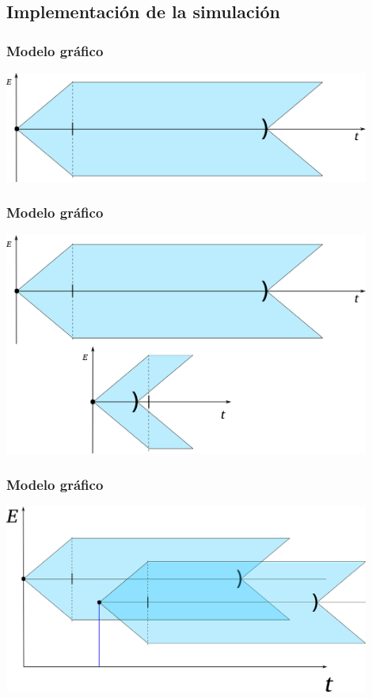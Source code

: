 \documentclass[handout]{beamer}
\theoremstyle{plain}
\theoremstyle{definition}
\theoremstyle{remark}
\begin{document}
                
\subsection{Implementación de la simulación}
 


\begin{frame}\frametitle{Modelo gráfico}
\centering
\includegraphics[width=0.9\textwidth]{text4616-5-8-3b.png}
\end{frame}

\begin{frame}\frametitle{Modelo gráfico}
\centering
\includegraphics[width=0.9\textwidth]{text4616-5-8-3.png}
\end{frame}

\begin{frame}\frametitle{Modelo gráfico}
\centering
\includegraphics[width=0.9\textwidth]{text4616-5.png}
\end{frame}
                                                           
\end{document}
